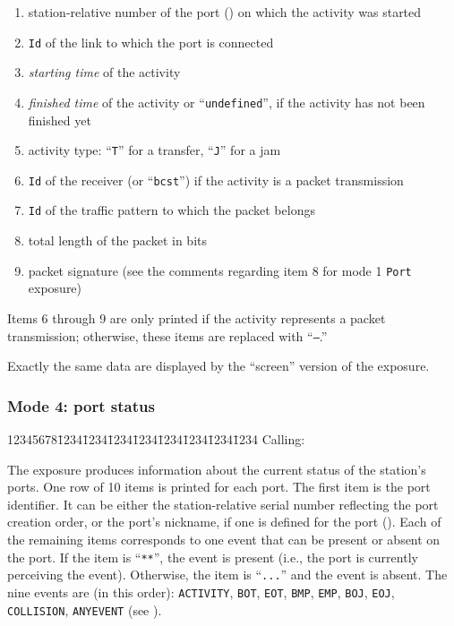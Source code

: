 \begin{enumerate}
\item
station-relative number of the port ()
on which the activity was started
\item
{\tt Id} of the link to which the port is connected
\item
{\em starting time\/} of the activity
\item
{\em finished time\/} of the activity or ``{\tt undefined}'', if the
activity has not been finished yet
\item
activity type: ``{\tt T}'' for a transfer, ``{\tt J}'' for a jam
\item
{\tt Id} of the receiver (or ``{\tt bcst}'') if the activity is a packet
transmission
\item
{\tt Id} of the traffic pattern to which the packet belongs
\item
total length of the packet in bits
\item
packet signature (see the comments regarding item 8 for mode 1
{\tt Port} exposure)
\end{enumerate}

Items 6 through 9 are only printed if the activity represents a
packet transmission; otherwise, these items are replaced with ``{\tt ---}.''

Exactly the same data are displayed by the ``screen'' version of the
exposure.

\subsubsection*{Mode 4: port status}
{\tt\begin{tabbing}
12345678\=1234\=1234\=1234\=1234\=1234\=1234\=1234\=1234\kill
{\rm Calling:}
\end{tabbing}}

The exposure produces information about the current status of the station's
ports.
One row of 10 items is printed for each port.
The first item is the port identifier.
It can be either the station-relative serial number reflecting the port
creation order, or the port's nickname, if one is defined for the port
().
Each of the remaining items corresponds to one event that can be
present or absent on the port.
If the item is ``{\tt ***}'', the event is present (i.e., the port is
currently perceiving the event).
Otherwise, the item is ``{\tt ...}'' and the event is absent.
The nine events are (in this order): {\tt ACTIVITY}, {\tt BOT}, {\tt EOT},
{\tt BMP}, {\tt EMP}, {\tt BOJ}, {\tt EOJ}, {\tt COLLISION},
{\tt ANYEVENT} (see ).

